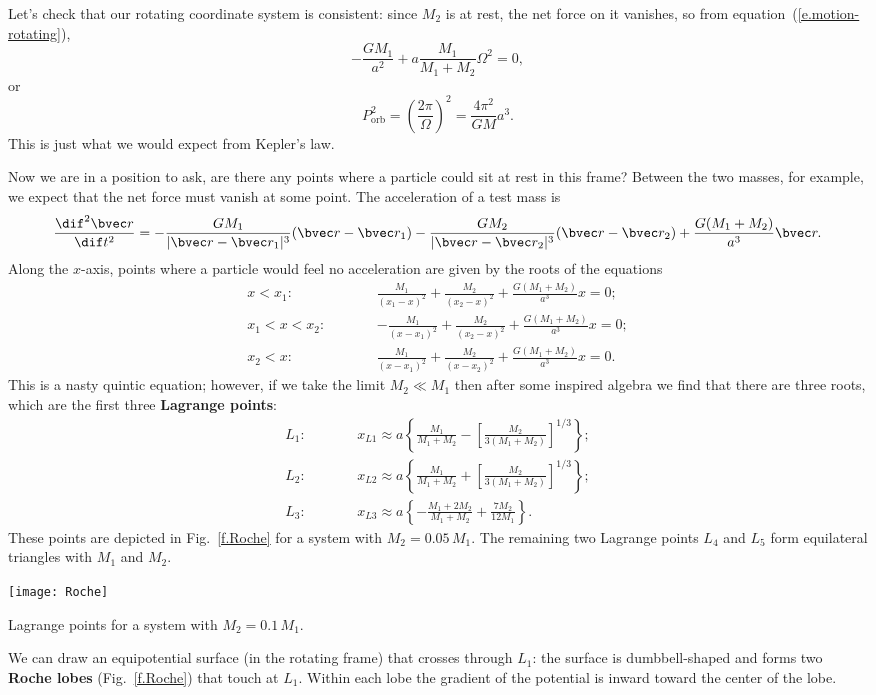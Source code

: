 Let's check that our rotating coordinate system is consistent: since $M_{2}$ is at rest, the net force on it vanishes, so from equation~(\ref{e.motion-rotating}),
\[ -\frac{GM_{1}}{a^{2}} + a\frac{M_{1}}{M_{1}+M_{2}}\Omega^{2} = 0, \]
or
\[ P_{\mathrm{orb}}^{2} = \left(\frac{2\pi}{\Omega}\right)^{2} = \frac{4\pi^{2}}{GM}a^{3}. \]
This is just what we would expect from Kepler's law.

Now we are in a position to ask, are there any points where a particle could sit at rest in this frame?
Between the two masses, for example, we expect that the net force must vanish at some point. The acceleration of a test mass is 
\begin{equation}\label{e.test-mass-acceleration-x}
\DDtt{\rv} = -\frac{GM_{1}}{|\rv-\rv_{1}|^{3}}(\rv-\rv_{1}) - \frac{GM_{2}}{|\rv-\rv_{2}|^{3}}(\rv-\rv_{2}) + \frac{G(M_{1}+M_{2})}{a^{3}} \rv.
\end{equation}
Along the $x$-axis, points where a particle would feel no acceleration are given by the roots of the equations
\begin{eqnarray*}
	x < x_{1}:&\qquad& \frac{M_{1}}{(x_{1}-x)^{2}} + \frac{M_{2}}{(x_{2}-x)^{2}} + \frac{G(M_{1}+M_{2})}{a^{3}} x = 0;\\
	x_{1} < x < x_{2}:&\qquad& -\frac{M_{1}}{(x-x_{1})^{2}} + \frac{M_{2}}{(x_{2}-x)^{2}} + \frac{G(M_{1}+M_{2})}{a^{3}} x = 0;\\
	x_{2} < x:&\qquad& \frac{M_{1}}{(x-x_{1})^{2}} + \frac{M_{2}}{(x-x_{2})^{2}} + \frac{G(M_{1}+M_{2})}{a^{3}} x = 0.
\end{eqnarray*}
This is a nasty quintic equation; however, if we take the limit $M_{2}\ll M_{1}$ then after some inspired algebra we find that there are three roots, which are the first three \textbf{Lagrange points}:
\begin{eqnarray*}
L_{1}: &\qquad& x_{L1} \approx a\left\{\frac{M_{1}}{M_{1}+M_{2}} - \left[\frac{M_{2}}{3(M_{1}+M_{2})}\right]^{1/3}\right\};\\
L_{2}: &\qquad& x_{L2} \approx a\left\{\frac{M_{1}}{M_{1}+M_{2}} + \left[\frac{M_{2}}{3(M_{1}+M_{2})}\right]^{1/3}\right\};\\
L_{3}: &\qquad& x_{L3} \approx a\left\{-\frac{M_{1}+2M_{2}}{M_{1}+M_{2}} + \frac{7M_{2}}{12M_{1}}\right\}.
\end{eqnarray*}
These points are depicted in Fig.~\ref{f.Roche} for a system with $M_{2} = 0.05\,M_{1}$.
The remaining two Lagrange points $L_{4}$ and $L_{5}$ form equilateral triangles with $M_{1}$ and $M_{2}$.
\begin{marginfigure}
\texttt{[image: Roche]}
\caption{Lagrange points for a system with $M_{2} = 0.1\,M_{1}$.
\label{f.Roche}}
\end{marginfigure}
We can draw an equipotential surface (in the rotating frame) that crosses through $L_{1}$: the surface is dumbbell-shaped and forms two \textbf{Roche lobes} (Fig.~\ref{f.Roche}) that touch at $L_{1}$.  Within each lobe the gradient of the potential is inward toward the center of the lobe.

